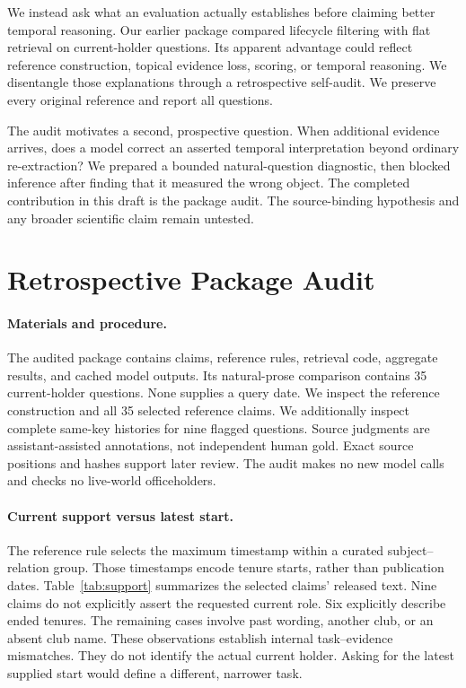 \documentclass[11pt]{article}
\begin{document}
We instead ask what an evaluation actually establishes before claiming better temporal reasoning.
Our earlier package compared lifecycle filtering with flat retrieval on current-holder questions.
Its apparent advantage could reflect reference construction, topical evidence loss, scoring, or temporal reasoning.
We disentangle those explanations through a retrospective self-audit.
We preserve every original reference and report all questions.

The audit motivates a second, prospective question.
When additional evidence arrives, does a model correct an asserted temporal interpretation beyond ordinary re-extraction?
We prepared a bounded natural-question diagnostic, then blocked inference after finding that it measured the wrong object.
The completed contribution in this draft is the package audit.
The source-binding hypothesis and any broader scientific claim remain untested.

\section{Retrospective Package Audit}
\label{sec:audit}

\paragraph{Materials and procedure.}
The audited package contains claims, reference rules, retrieval code, aggregate results, and cached model outputs.
Its natural-prose comparison contains 35 current-holder questions.
None supplies a query date.
We inspect the reference construction and all 35 selected reference claims.
We additionally inspect complete same-key histories for nine flagged questions.
Source judgments are assistant-assisted annotations, not independent human gold.
Exact source positions and hashes support later review.
The audit makes no new model calls and checks no live-world officeholders.

\paragraph{Current support versus latest start.}
The reference rule selects the maximum timestamp within a curated subject--relation group.
Those timestamps encode tenure starts, rather than publication dates.
Table~\ref{tab:support} summarizes the selected claims' released text.
Nine claims do not explicitly assert the requested current role.
Six explicitly describe ended tenures.
The remaining cases involve past wording, another club, or an absent club name.
These observations establish internal task--evidence mismatches.
They do not identify the actual current holder.
Asking for the latest supplied start would define a different, narrower task.
\end{document}
